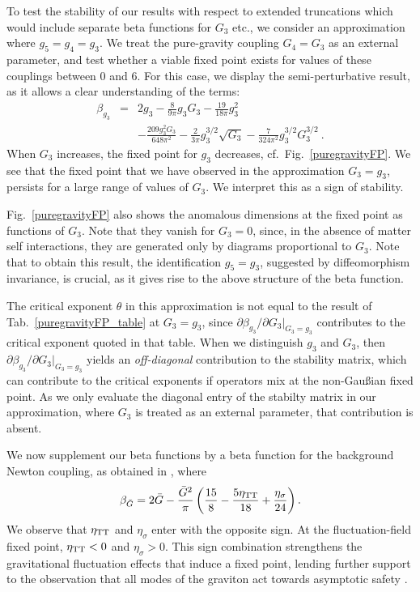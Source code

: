 \documentclass[11pt]{book} %
\newcommand{\be}{\begin{equation}}
\newcommand{\ee}{\end{equation}}
\newcommand{\bea}{\begin{eqnarray}}
\newcommand{\eea}{\end{eqnarray}}
\numberwithin{equation}{chapter}
\begin{document}
To test the stability of our results with respect to extended truncations which would include separate
beta functions for $G_3$ etc.,
we consider an approximation where $g_5=g_4=g_3$.
We treat the pure-gravity coupling $G_4=G_3$ as an external parameter,
and test whether a viable fixed point exists for values of these couplings between 0 and 6.
For this case, we display the semi-perturbative result, as it allows a clear understanding of the terms:
\bea
\beta_{g_3} &=&2 g_3 - \frac{8}{9 \pi} g_3 G_3
- \frac{19}{18 \pi}g_3^2
\\
&{}& - \frac{209 g_3^2 G_3}{648 \pi^2}
- \frac{2}{3 \pi}g_3^{3/2}\sqrt{G_3}
- \frac{7}{324 \pi^2}g_3^{3/2}G_3^{3/2}\ .
\nonumber
\eea
When $G_3$ increases, the fixed point for $g_3$ decreases, cf.~Fig.~\ref{puregravityFP}.
We see that the fixed point that we have observed in the approximation $G_3=g_3$,
persists for a large range of values of $G_3$.
We interpret this as a sign of stability.

Fig.~\ref{puregravityFP} also shows the anomalous dimensions at the fixed point as functions of $G_3$.
Note that they vanish for $G_3=0$, since, in the absence of matter self interactions, they are
generated only by diagrams proportional to $G_3$.
 Note that to obtain this result, the identification $g_5=g_3$,
 suggested by diffeomorphism invariance, is crucial,
 as it gives rise to the above structure of the beta function.

The critical exponent $\theta$ in this approximation is not equal to the result of
Tab.~\ref{puregravityFP_table} at $G_3=g_3$,
since $\partial \beta_{g_3}/\partial G_3 \vert_{G_3=g_3}$ contributes to the critical
exponent quoted in that table. When we distinguish $g_3$ and $G_3$,
then  $\partial \beta_{g_3}/\partial G_3 \vert_{G_3=g_3}$ yields an \emph{off-diagonal} contribution
to the stability matrix, which can contribute to the critical exponents if operators mix
at the non-Gau\ss{}ian fixed point. As we only evaluate the diagonal entry of the stabilty
matrix in our approximation, where $G_3$ is treated as an external parameter, that contribution is absent.


We now supplement our beta functions by a beta function for the background Newton coupling,
as obtained in \cite{Percacci:2015wwa}, where
\be
\beta_{\bar{G}}=2 \bar{G} - \frac{\bar{G}^2}{\pi} \left(\frac{15}{8}- \frac{5 \eta_{\rm TT}}{18 }+ \frac{\eta_{\sigma}}{24} \right).
\ee
We observe that $\eta_{\rm TT}$ and $\eta_{\sigma}$ enter with the opposite sign.
At the fluctuation-field fixed point, $\eta_{\rm TT}<0$  and $\eta_{\sigma}>0$.
This sign combination strengthens the gravitational fluctuation effects that induce a fixed point,
lending further support to the observation that all modes of the graviton act towards asymptotic
safety \cite{Reuter:2008qx, Reuter:2008wj}.
\end{document}
